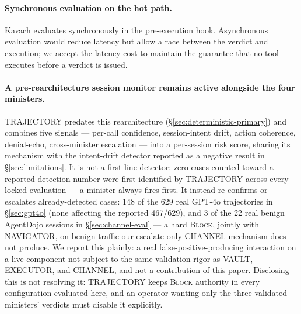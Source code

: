 \paragraph{Synchronous evaluation on the hot path.} Kavach evaluates
synchronously in the pre-execution hook. Asynchronous evaluation would
reduce latency but allow a race between the verdict and execution; we accept
the latency cost to maintain the guarantee that no tool executes before a
verdict is issued.

\paragraph{A pre-rearchitecture session monitor remains active alongside the
four ministers.} TRAJECTORY predates this rearchitecture
(\S\ref{sec:deterministic-primary}) and combines five signals ---
per-call confidence, session-intent drift, action coherence, denial-echo,
cross-minister escalation --- into a per-session risk score, sharing its
mechanism with the intent-drift detector reported as a negative result
in \S\ref{sec:limitations}. It is not a first-line detector: zero cases
counted toward a reported detection number were first identified by
TRAJECTORY across every locked evaluation --- a minister always fires
first. It instead re-confirms or escalates already-detected cases: 148 of
the 629 real GPT-4o trajectories in \S\ref{sec:gpt4o} (none affecting the
reported 467/629), and 3 of the 22 real benign AgentDojo sessions in
\S\ref{sec:channel-eval} --- a hard \textsc{Block}, jointly with
NAVIGATOR, on benign traffic our escalate-only CHANNEL mechanism does not
produce. We report this plainly: a real false-positive-producing
interaction on a live component not subject to the same validation rigor
as VAULT, EXECUTOR, and CHANNEL, and not a contribution of this paper.
Disclosing this is not resolving it: TRAJECTORY keeps \textsc{Block}
authority in every configuration evaluated here, and an operator wanting
only the three validated ministers' verdicts must disable it explicitly.
